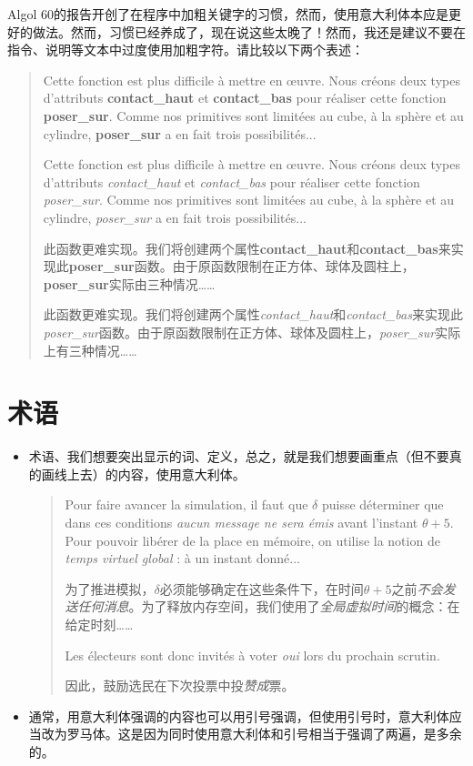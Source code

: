 Algol 60的报告开创了在程序中加粗关键字的习惯，然而，使用意大利体本应是更好的做法。然而，习惯已经养成了，现在说这些太晚了！然而，我还是建议不要在指令、说明等文本中过度使用加粗字符。请比较以下两个表述：

\begin{quote}
    Cette fonction est plus difficile à mettre en œuvre. Nous créons deux types d'attributs \textbf{contact\_haut} et \textbf{contact\_bas} pour réaliser cette fonction \textbf{poser\_sur}. Comme nos primitives sont limitées au cube, à la sphère et au cylindre, \textbf{poser\_sur} a en fait trois possibilités...

    Cette fonction est plus difficile à mettre en œuvre. Nous créons deux types d'attributs \emph{contact\_haut} et \emph{contact\_bas} pour réaliser cette fonction \emph{poser\_sur}. Comme nos primitives sont limitées au cube, à la sphère et au cylindre, \emph{poser\_sur} a en fait trois possibilités...

    \begin{bil}
        此函数更难实现。我们将创建两个属性\textbf{contact\_haut}和\textbf{contact\_bas}来实现此\textbf{poser\_sur}函数。由于原函数限制在正方体、球体及圆柱上，\textbf{poser\_sur}实际由三种情况……

        此函数更难实现。我们将创建两个属性\emph{contact\_haut}和\emph{contact\_bas}来实现此\emph{poser\_sur}函数。由于原函数限制在正方体、球体及圆柱上，\emph{poser\_sur}实际上有三种情况……
    \end{bil}
\end{quote}

\section{术语}

\begin{itemize}
    \item 术语、我们想要突出显示的词、定义，总之，就是我们想要画重点（但不要真的画线上去）的内容，使用意大利体。\\
    \begin{quote}  
        Pour faire avancer la simulation, il faut que $\delta$ puisse déterminer que dans ces conditions \emph{aucun message ne sera émis} avant l'instant $\theta + 5$. Pour pouvoir libérer de la place en mémoire, on utilise la notion de \emph{temps virtuel global} : à un instant donné...
        \begin{bil}
            为了推进模拟，$\delta$必须能够确定在这些条件下，在时间$\theta + 5$之前\emph{不会发送任何消息}。为了释放内存空间，我们使用了\emph{全局虚拟时间}的概念：在给定时刻……
        \end{bil}
        
        Les électeurs sont donc invités à voter \emph{oui} lors du prochain scrutin.
        \begin{bil}
            因此，鼓励选民在下次投票中投\emph{赞成}票。
        \end{bil}
    \end{quote}
    \item 通常，用意大利体强调的内容也可以用引号强调，但使用引号时，意大利体应当改为罗马体。这是因为同时使用意大利体和引号相当于强调了两遍，是多余的。
\end{itemize}

